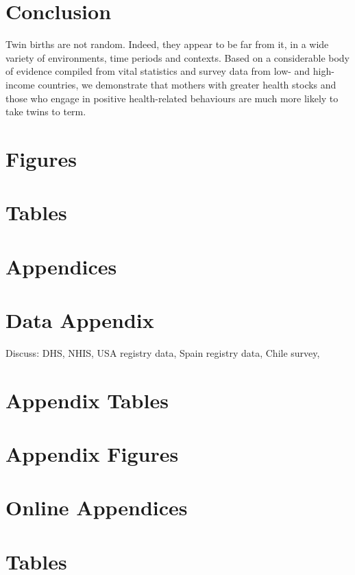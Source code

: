 \documentclass[subeqn]{article}
\begin{document}
\begin{spacing}{1.4}
\section{Conclusion}                               \label{TWINscn:conclusion}
Twin births are not random.  Indeed, they appear to be far from it, in a wide
variety of environments, time periods and contexts.  Based on a considerable 
body of evidence compiled from vital statistics and survey data from low- and 
high-income countries, we demonstrate that mothers with greater health stocks 
and those who engage in positive health-related behaviours are much more likely 
to take twins to term.  

\newpage
\section*{Figures}


\clearpage
\section*{Tables}

\clearpage




\newpage
\appendix
\section*{Appendices}
\section{Data Appendix}
Discuss: DHS, NHIS, USA registry data, Spain registry data, Chile survey, 

\newpage
\end{spacing}

\section{Appendix Tables}

\clearpage
\newpage

\section{Appendix Figures}


\newpage
\appendix
\section*{Online Appendices}
\section{Tables}

\end{document}
